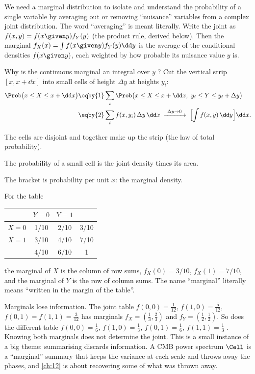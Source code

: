 We need a marginal distribution to isolate and understand the probability of
a single variable by averaging out or removing ``nuisance'' variables from a
complex joint distribution. The word ``averaging'' is meant literally.
Write the joint as $f(x,y)=f(x\given y)f_Y(y)$ (the product rule, derived
below). Then the marginal $f_X(x)=\int f(x\given y)f_Y(y)\dd y$ is the
average of the conditional densities $f(x\given y)$, each weighted by how
probable its nuisance value $y$ is.

Why is the continuous marginal an integral over $y$
? Cut the vertical strip $[x,x+\dd x]$ into
small cells of height $\Delta y$ at heights $y_i$:
\begin{align*}
  \Prob\bigl(x\le X\le x+\dd x\bigr)
  &\eqby{1} \sum_i\Prob\bigl(x\le X\le x+\dd x,\ y_i\le Y\le y_i+\Delta y\bigr)
  \\
  &\eqby{2} \sum_i f(x,y_i)\,\Delta y\,\dd x
   \;\xrightarrow{\ \Delta y\to0\ }\;\Bigl[\int f(x,y)\,\dd y\Bigr]\dd x .
\end{align*}
\begin{explain}
  \item The cells are disjoint and together make up the strip (the law of
        total probability).
  \item The probability of a small cell is the joint density times its area.
\end{explain}
The bracket is probability per unit $x$: the marginal density.

\label{1b:ex:margins}
For the table 
\begin{center}
\begin{tabular}{c|cc|c}
 & $Y=0$ & $Y=1$ & \\\hline
$X=0$ & 1/10 & 2/10 & 3/10\\
$X=1$ & 3/10 & 4/10 & 7/10\\\hline
 & 4/10 & 6/10 & 1
\end{tabular}
\end{center}
the marginal of $X$ is the column of row sums, $f_X(0)=3/10$, $f_X(1)=7/10$,
and the marginal of $Y$ is the row of column sums. The name ``marginal''
literally means ``written in the margin of the table''.

Marginals lose information. The joint table
$f(0,0)=\tfrac1{12}$, $f(1,0)=\tfrac5{12}$, $f(0,1)=f(1,1)=\tfrac3{12}$ has
marginals $f_X=(\tfrac13,\tfrac23)$ and $f_Y=(\tfrac12,\tfrac12)$. So does the
different table $f(0,0)=\tfrac16$, $f(1,0)=\tfrac13$, $f(0,1)=\tfrac16$,
$f(1,1)=\tfrac13$ . Knowing both marginals
does not determine the joint. This is a small instance of a big theme:
summarising discards information. A CMB power spectrum $\Cell$ is a
``marginal'' summary that keeps the variance at each scale and throws away
the phases, and \cref{ch:12} is about recovering some of what was thrown
away.

